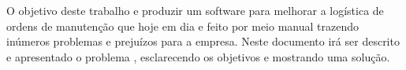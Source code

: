       
    
	
	

 
 


%



\begin{resumo}
	O objetivo deste trabalho e produzir um software para melhorar a logística de ordens de manutenção que hoje em dia e feito por meio manual trazendo inúmeros problemas e prejuízos para  a empresa. Neste documento irá ser descrito e apresentado o problema , esclarecendo os objetivos e mostrando uma solução.

 \vspace{\onelineskip}
    
 \noindent
 
\end{resumo}

